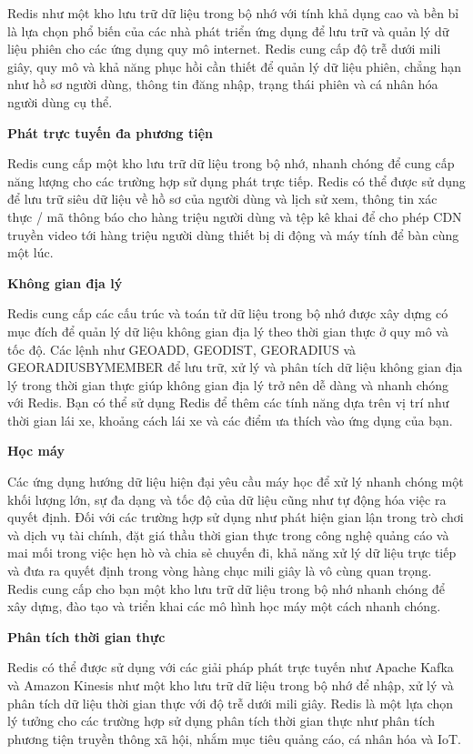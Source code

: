 Redis như một kho lưu trữ dữ liệu trong bộ nhớ với tính khả dụng cao và bền bỉ là lựa chọn phổ biến của các nhà phát triển ứng dụng để lưu trữ và quản lý dữ liệu phiên cho các ứng dụng quy mô internet. Redis cung cấp độ trễ dưới mili giây, quy mô và khả năng phục hồi cần thiết để quản lý dữ liệu phiên, chẳng hạn như hồ sơ người dùng, thông tin đăng nhập, trạng thái phiên và cá nhân hóa người dùng cụ thể.

\textbf{Phát trực tuyến đa phương tiện}

Redis cung cấp một kho lưu trữ dữ liệu trong bộ nhớ, nhanh chóng để cung cấp năng lượng cho các trường hợp sử dụng phát trực tiếp. Redis có thể được sử dụng để lưu trữ siêu dữ liệu về hồ sơ của người dùng và lịch sử xem, thông tin xác thực / mã thông báo cho hàng triệu người dùng và tệp kê khai để cho phép CDN truyền video tới hàng triệu người dùng thiết bị di động và máy tính để bàn cùng một lúc.

\textbf{Không gian địa lý}

Redis cung cấp các cấu trúc và toán tử dữ liệu trong bộ nhớ được xây dựng có mục đích để quản lý dữ liệu không gian địa lý theo thời gian thực ở quy mô và tốc độ. Các lệnh như GEOADD, GEODIST, GEORADIUS và GEORADIUSBYMEMBER để lưu trữ, xử lý và phân tích dữ liệu không gian địa lý trong thời gian thực giúp không gian địa lý trở nên dễ dàng và nhanh chóng với Redis. Bạn có thể sử dụng Redis để thêm các tính năng dựa trên vị trí như thời gian lái xe, khoảng cách lái xe và các điểm ưa thích vào ứng dụng của bạn.

\textbf{Học máy}

Các ứng dụng hướng dữ liệu hiện đại yêu cầu máy học để xử lý nhanh chóng một khối lượng lớn, sự đa dạng và tốc độ của dữ liệu cũng như tự động hóa việc ra quyết định. Đối với các trường hợp sử dụng như phát hiện gian lận trong trò chơi và dịch vụ tài chính, đặt giá thầu thời gian thực trong công nghệ quảng cáo và mai mối trong việc hẹn hò và chia sẻ chuyến đi, khả năng xử lý dữ liệu trực tiếp và đưa ra quyết định trong vòng hàng chục mili giây là vô cùng quan trọng. Redis cung cấp cho bạn một kho lưu trữ dữ liệu trong bộ nhớ nhanh chóng để xây dựng, đào tạo và triển khai các mô hình học máy một cách nhanh chóng.

\textbf{Phân tích thời gian thực}

Redis có thể được sử dụng với các giải pháp phát trực tuyến như Apache Kafka và Amazon Kinesis như một kho lưu trữ dữ liệu trong bộ nhớ để nhập, xử lý và phân tích dữ liệu thời gian thực với độ trễ dưới mili giây. Redis là một lựa chọn lý tưởng cho các trường hợp sử dụng phân tích thời gian thực như phân tích phương tiện truyền thông xã hội, nhắm mục tiêu quảng cáo, cá nhân hóa và IoT.

